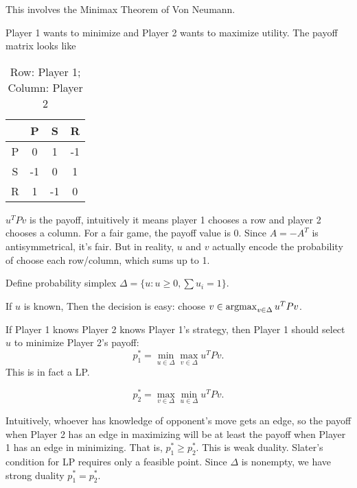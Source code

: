 \documentclass[class=article,crop=false]{standalone}
\begin{document}
This involves the Minimax Theorem of Von Neumann.
\begin{eg}
Player 1 wants to minimize and Player 2 wants to maximize utility. The payoff matrix looks like
\begin{table}[H]
	\centering
	\begin{tabular}{c||c|c|c}
		&P&S&R\\
		\hline
		\hline
		P&0&1&-1\\
		\hline
		S&-1&0&1\\
		\hline
		R&1&-1&0
	\end{tabular}
	\caption*{Row: Player 1; Column: Player 2}
\end{table}

$ u^{T}Pv$ is the payoff, intuitively it means player 1 chooses a row and player 2 chooses a column. For a fair game, the payoff value is 0. Since $ A=-A^{T}$ is antisymmetrical, it's fair. But in reality, $ u$ and  $ v$ actually encode the probability of choose each row/column, which sums up to 1.

Define probability simplex $ \Delta = \{u:u\geq 0, \sum u_i = 1\} $.

\begin{case}
If $ u$ is known, 
Then the decision is easy: choose $ v \in \operatorname*{argmax}_{v \in \Delta} u^{T}Pv$.

If Player 1 knows Player 2 knows Player 1's strategy, then Player 1 should select $ u$ to minimize Player 2's payoff:
 \[
p_1^* = \min_{u \in \Delta} \max_{v \in \Delta} u^{T}Pv
.\]
This is in fact a LP.
\end{case}
\begin{case}
\[
p_2^* = \max_{v \in \Delta} \min_{u \in \Delta} u^{T}Pv
.\] 
\end{case}
Intuitively, whoever has knowledge of opponent's move gets an edge, so the payoff when Player 2 has an edge in maximizing will be at least the payoff when Player 1 has an edge in minimizing. That is, $ p_1^* \geq p_2^* $. This is weak duality. Slater's condition for LP requires only a feasible point. Since $ \Delta$ is nonempty, we have strong duality $ p_1^* =p_2^* $.
\end{eg}
\end{document}
